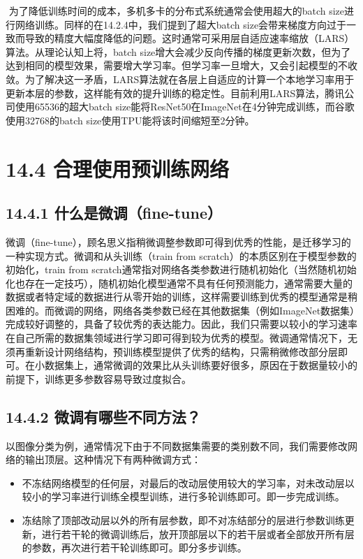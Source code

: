 ​ 为了降低训练时间的成本，多机多卡的分布式系统通常会使用超大的batch
size进行网络训练。同样的在14.2.4中，我们提到了超大batch
size会带来梯度方向过于一致而导致的精度大幅度降低的问题。这时通常可采用层自适应速率缩放（LARS）算法。从理论认知上将，batch
size增大会减少反向传播的梯度更新次数，但为了达到相同的模型效果，需要增大学习率。但学习率一旦增大，又会引起模型的不收敛。为了解决这一矛盾，LARS算法就在各层上自适应的计算一个本地学习率用于更新本层的参数，这样能有效的提升训练的稳定性。目前利用LARS算法，腾讯公司使用65536的超大batch
size能将ResNet50在ImageNet在4分钟完成训练，而谷歌使用32768的batch
size使用TPU能将该时间缩短至2分钟。

\section{14.4
合理使用预训练网络}\label{ux5408ux7406ux4f7fux7528ux9884ux8badux7ec3ux7f51ux7edc}

\subsection{14.4.1
什么是微调（fine-tune）}\label{ux4ec0ux4e48ux662fux5faeux8c03fine-tune}

​
微调（fine-tune），顾名思义指稍微调整参数即可得到优秀的性能，是迁移学习的一种实现方式。微调和从头训练（train
from scratch）的本质区别在于模型参数的初始化，train from
scratch通常指对网络各类参数进行随机初始化（当然随机初始化也存在一定技巧），随机初始化模型通常不具有任何预测能力，通常需要大量的数据或者特定域的数据进行从零开始的训练，这样需要训练到优秀的模型通常是稍困难的。而微调的网络，网络各类参数已经在其他数据集（例如ImageNet数据集）完成较好调整的，具备了较优秀的表达能力。因此，我们只需要以较小的学习速率在自己所需的数据集领域进行学习即可得到较为优秀的模型。微调通常情况下，无须再重新设计网络结构，预训练模型提供了优秀的结构，只需稍微修改部分层即可。在小数据集上，通常微调的效果比从头训练要好很多，原因在于数据量较小的前提下，训练更多参数容易导致过度拟合。

\subsection{14.4.2
微调有哪些不同方法？}\label{ux5faeux8c03ux6709ux54eaux4e9bux4e0dux540cux65b9ux6cd5}

​
以图像分类为例，通常情况下由于不同数据集需要的类别数不同，我们需要修改网络的输出顶层。这种情况下有两种微调方式：

\begin{itemize}
\item
  不冻结网络模型的任何层，对最后的改动层使用较大的学习率，对未改动层以较小的学习率进行训练全模型训练，进行多轮训练即可。即一步完成训练。
\item
  冻结除了顶部改动层以外的所有层参数，即不对冻结部分的层进行参数训练更新，进行若干轮的微调训练后，放开顶部层以下的若干层或者全部放开所有层的参数，再次进行若干轮训练即可。即分多步训练。
\end{itemize}

